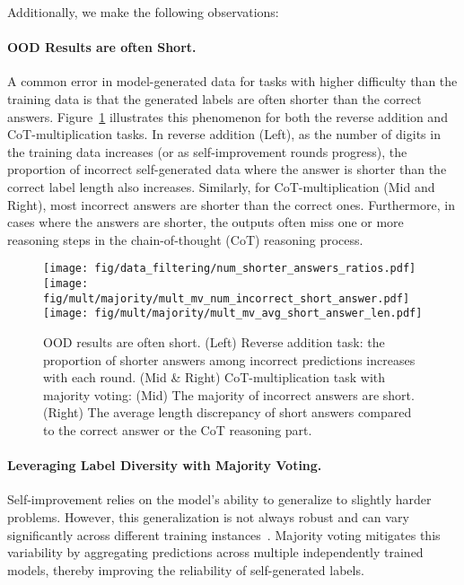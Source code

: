 Additionally, we make the following observations: 
\paragraph{OOD Results are often Short. } A common error in model-generated data for tasks with higher difficulty than the training data is that the generated labels are often shorter than the correct answers. Figure~\ref{fig:num_shorter_answers} illustrates this phenomenon for both the reverse addition and CoT-multiplication tasks. In reverse addition (Left), as the number of digits in the training data increases (or as self-improvement rounds progress), the proportion of incorrect self-generated data where the answer is shorter than the correct label length also increases. Similarly, for CoT-multiplication (Mid and Right), most incorrect answers are shorter than the correct ones. Furthermore, in cases where the answers are shorter, the outputs often miss one or more reasoning steps in the chain-of-thought (CoT) reasoning process.

\begin{figure}[ht]
    \centering
    \texttt{[image: fig/data\_filtering/num\_shorter\_answers\_ratios.pdf]}
    \texttt{[image: fig/mult/majority/mult\_mv\_num\_incorrect\_short\_answer.pdf]}
    \texttt{[image: fig/mult/majority/mult\_mv\_avg\_short\_answer\_len.pdf]}
    \caption{OOD results are often short. (Left) Reverse addition task: the proportion of shorter answers among incorrect predictions increases with each round. (Mid \& Right) CoT-multiplication task with majority voting: (Mid) The majority of incorrect answers are short. (Right) The average length discrepancy of short answers compared to the correct answer or the CoT reasoning part.}
    \label{fig:num_shorter_answers}
\end{figure}

\paragraph{Leveraging Label Diversity with Majority Voting. }
Self-improvement relies on the model's ability to generalize to slightly harder problems. However, this generalization is not always robust and can vary significantly across different training instances~\citep{zhou2024transformers}. Majority voting mitigates this variability by aggregating predictions across multiple independently trained models, thereby improving the reliability of self-generated labels.

